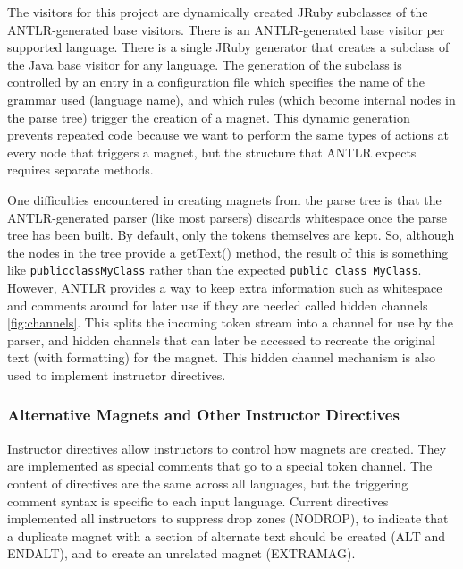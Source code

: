 \documentclass[letter,10pt]{article}
\begin{document}
The visitors for this project are dynamically created JRuby subclasses 
of the ANTLR-generated base visitors. There is an ANTLR-generated base 
visitor per supported language. There is a single JRuby generator that 
creates a subclass of the Java base visitor for any language. The 
generation of the subclass is controlled by an entry in a configuration 
file which specifies the name of the grammar used (language name), and 
which rules (which become internal nodes in the parse tree) trigger the 
creation of a magnet. This dynamic generation prevents repeated code 
because we want to perform the same types of actions at every node that 
triggers a magnet, but the structure that ANTLR expects requires 
separate methods.




One difficulties encountered in creating magnets from the parse tree 
is that the ANTLR-generated parser (like most parsers) discards 
whitespace once the parse tree has been built. By default, only the 
tokens themselves are kept. So, although the nodes in the tree 
provide a getText() method, the result of this is something 
like \verb~publicclassMyClass~ rather than the expected 
\verb~public class MyClass~. However, ANTLR provides a way to keep extra
information such as whitespace and comments around for later use if they 
are needed called hidden channels \ref{fig:channels}. This splits the 
incoming token stream into a channel for use by the parser, and hidden 
channels that can later be accessed to recreate the original text (with 
formatting) for the magnet. This hidden channel mechanism is also used 
to implement instructor directives.

\label{fig:channels}


\subsubsection{Alternative Magnets and Other Instructor Directives}

Instructor directives allow instructors to control how magnets are 
created. They are implemented as special comments that go to a 
special token channel. The content of directives are the same across all 
languages, but the triggering comment syntax is specific to each input 
language. Current directives implemented all instructors to suppress 
drop zones (NODROP), to indicate that a duplicate magnet with a section 
of alternate text should be created (ALT and ENDALT), and to create an 
unrelated magnet (EXTRAMAG).
\end{document}
